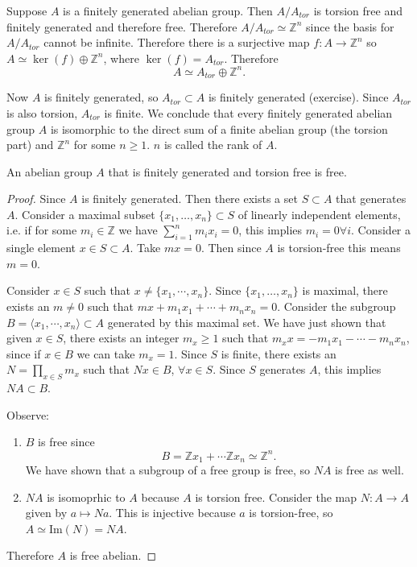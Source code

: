 \begin{obsv}
Suppose $A$ is a finitely generated abelian group. Then
$A / A_{tor}$ is torsion free and finitely generated and therefore
free. Therefore $A / A_{tor} \simeq \mathbb{Z}^n$ since the basis for
$A / A_{tor}$ cannot be infinite. Therefore there is a surjective map
$f : A \to \mathbb{Z}^n$ so $A \simeq \ker(f) \oplus \mathbb{Z}^n$,
where $\ker(f) = A_{tor}$. Therefore
$$A \simeq A_{tor} \oplus \mathbb{Z}^n.$$

Now $A$ is finitely generated, so $A_{tor} \subset A$ is finitely
generated (exercise). Since $A_{tor}$ is also torsion, $A_{tor}$ is
finite. We conclude that every finitely generated abelian group $A$ is
isomorphic to the direct sum of a finite abelian group (the torsion part)
and $\mathbb{Z}^n$ for some $n \geq 1$. $n$ is called the rank of $A$.
\end{obsv}

\begin{theorem}
An abelian group $A$ that is finitely generated and torsion free is free.
\end{theorem}

\begin{proof}
Since $A$ is finitely generated. Then there exists a set $S \subset A$
that generates $A$. Consider a maximal subset
$\{ x_1, \dots, x_n \} \subset S$ of linearly independent elements,
i.e. if for some $m_i \in \mathbb{Z}$ we have $\sum_{i=1}^n m_i x_i =
0$, this implies $m_i = 0 \forall i$. Consider a single element
$x \in S \subset A$. Take $mx = 0$. Then since $A$ is torsion-free
this means $m = 0$.

Consider $x \in S$ such that $x \neq \{ x_1, \cdots, x_n \}$. Since
$\{x_1, \dots, x_n\}$ is maximal, there exists an $m \neq 0$ such that
$m x + m_1 x_1 + \cdots + m_n x_n = 0$. Consider the subgroup
$B = \langle x_1, \cdots, x_n \rangle \subset A$ generated by this
maximal set. We have just shown that given $x \in S$, there exists an
integer $m_x \geq 1$ such that
$m_x x = - m_1 x_1 - \cdots - m_n x_n$, since if $x \in B$ we can take
$m_x = 1$. Since $S$ is finite, there exists an
$N = \prod_{x \in S} m_x$ such that $N x \in B$, $\forall x \in
S$. Since $S$ generates $A$, this implies $NA \subset B$.

Observe:
\begin{enumerate}
  \item{
    $B$ is free since
    $$
    B = \mathbb{Z} x_1 + \cdots \mathbb{Z} x_n \simeq \mathbb{Z}^n.
    $$
    We have shown that a subgroup of a free group is free, so $N
    A$ is free as well.
  }
  \item{
    $NA$ is isomoprhic to $A$ because $A$ is torsion free. Consider
    the map $N : A \to A$ given by $a \mapsto N a$. This is injective
    because $a$ is torsion-free, so $A \simeq \mathrm{Im}(N) = N A$.
  }
\end{enumerate}
Therefore $A$ is free abelian.
\end{proof}

